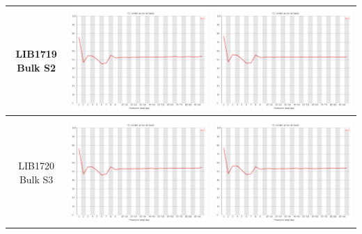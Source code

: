 \begin{center}
\begin{tabular}{ccc}
\begin{sideways}LIB1719 Bulk S2\end{sideways} & \includegraphics[width=0.4 \textwidth]{Appendices/images/Sample_LIB1719_base_gc_R1.png} & \includegraphics[width=0.4 \textwidth]{Appendices/images/Sample_LIB1719_base_gc_R2.png} \\ \midrule  \\
\begin{sideways}LIB1720 Bulk S3 \end{sideways} & \includegraphics[width=0.4 \textwidth]{Appendices/images/Sample_LIB1720_base_gc_R1.png} & \includegraphics[width=0.4 \textwidth]{Appendices/images/Sample_LIB1720_base_gc_R2.png} \\
\bottomrule
\end{tabular}
\end{center}


